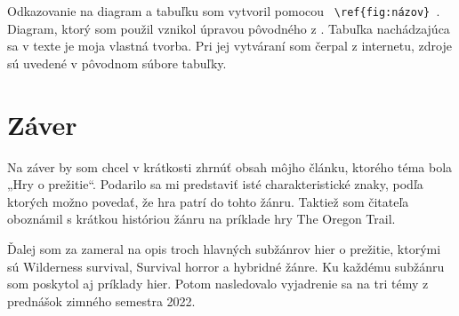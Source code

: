 \documentclass[10pt,oneoside,slovak,a4paper]{article}
\begin{document}
Odkazovanie na  diagram a tabuľku som vytvoril pomocou  \verb= \ref{fig:názov} =. Diagram, ktorý som použil vznikol úpravou pôvodného z \cite{Reid}. Tabuľka nachádzajúca sa v texte je moja vlastná tvorba. Pri jej vytváraní som čerpal z internetu, zdroje sú uvedené v pôvodnom súbore tabuľky.



\section{Záver} \label{zaver} %

Na záver by som chcel v krátkosti zhrnúť obsah môjho článku, ktorého téma bola „Hry o prežitie“.  
Podarilo sa mi predstaviť isté charakteristické znaky, podľa ktorých možno povedať, že hra patrí do tohto žánru. Taktiež som čitateľa oboznámil s krátkou históriou žánru na príklade hry  The Oregon Trail. 

Ďalej som za zameral na opis troch hlavných subžánrov hier o prežitie, ktorými sú Wilderness survival, Survival horror a hybridné žánre. Ku každému subžánru som poskytol aj príklady hier.
Potom nasledovalo vyjadrenie sa na tri témy z prednášok zimného semestra 2022.




\newpage

\end{document}
